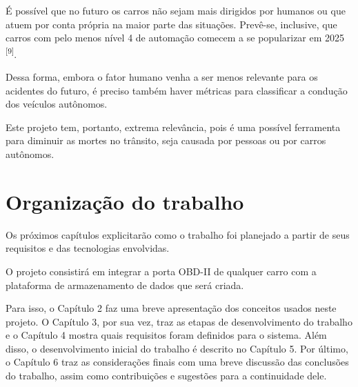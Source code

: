 É possível que no futuro os carros não sejam mais dirigidos por humanos ou que atuem por conta própria na maior parte das situações. Prevê-se, inclusive, que carros com pelo menos nível 4 de automação comecem a se popularizar em 2025 \textsuperscript{[9]}.

Dessa forma, embora o fator humano venha a ser menos relevante para os acidentes do futuro, é preciso também haver métricas para classificar a condução dos veículos autônomos.

Este projeto tem, portanto, extrema relevância, pois é uma possível ferramenta para diminuir as mortes no trânsito, seja causada por pessoas ou por carros autônomos.

\section{Organização do trabalho}
Os próximos capítulos explicitarão como o trabalho foi planejado a partir de seus requisitos e das tecnologias envolvidas.

O projeto consistirá em integrar a porta OBD-II de qualquer carro com a plataforma de armazenamento de dados que será criada.

Para isso, o Capítulo 2 faz uma breve apresentação dos conceitos usados neste projeto. O Capítulo 3, por sua vez, traz as etapas de desenvolvimento do trabalho e o Capítulo 4 mostra quais requisitos foram definidos para o sistema. Além disso, o desenvolvimento inicial do trabalho é descrito no Capítulo 5. Por último, o Capítulo 6 traz as considerações finais com uma breve discussão das conclusões do trabalho, assim como contribuições e sugestões para a continuidade dele.